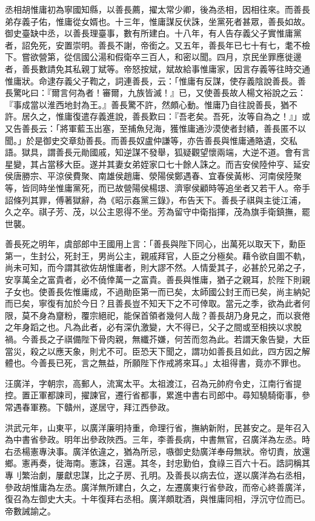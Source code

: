 丞相胡惟庸初為寧國知縣，以善長薦，擢太常少卿，後為丞相，因相往來。而善長弟存義子佑，惟庸從女婿也。十三年，惟庸謀反伏誅，坐黨死者甚眾，善長如故。御史臺缺中丞，以善長理臺事，數有所建白。十八年，有人告存義父子實惟庸黨者，詔免死，安置崇明。善長不謝，帝銜之。又五年，善長年已七十有七，耄不檢下。嘗欲營第，從信國公湯和假衛卒三百人，和密以聞。四月，京民坐罪應徙邊者，善長數請免其私親丁斌等。帝怒按斌，斌故給事惟庸家，因言存義等往時交通惟庸狀。命逮存義父子鞫之，詞連善長，云：「惟庸有反謀，使存義陰說善長。善長驚叱曰：『爾言何為者！審爾，九族皆滅！』已，又使善長故人楊文裕說之云：『事成當以淮西地封為王。』善長驚不許，然頗心動。惟庸乃自往說善長，猶不許。居久之，惟庸復遣存義進說，善長歎曰：『吾老矣。吾死，汝等自為之！』」或又告善長云：「將軍藍玉出塞，至捕魚兒海，獲惟庸通沙漠使者封績，善長匿不以聞。」於是御史交章劾善長。而善長奴盧仲謙等，亦告善長與惟庸通賂遺，交私語。獄具，謂善長元勛國戚，知逆謀不發舉，狐疑觀望懷兩端，大逆不道。會有言星變，其占當移大臣。遂并其妻女弟姪家口七十餘人誅之。而吉安侯陸仲亨、延安侯唐勝宗、平涼侯費聚、南雄侯趙庸、滎陽侯鄭遇春、宜春侯黃彬、河南侯陸聚等，皆同時坐惟庸黨死，而已故營陽侯楊璟、濟寧侯顧時等追坐者又若干人。帝手詔條列其罪，傅著獄辭，為《昭示姦黨三錄》，布告天下。善長子祺與主徙江浦，久之卒。祺子芳、茂，以公主恩得不坐。芳為留守中衛指揮，茂為旗手衛鎮撫，罷世襲。

善長死之明年，虞部郎中王國用上言：「善長與陛下同心，出萬死以取天下，勳臣第一，生封公，死封王，男尚公主，親戚拜官，人臣之分極矣。藉令欲自圖不軌，尚未可知，而今謂其欲佐胡惟庸者，則大謬不然。人情愛其子，必甚於兄弟之子，安享萬全之富貴者，必不僥倖萬一之富貴。善長與惟庸，猶子之親耳，於陛下則親子女也。使善長佐惟庸成，不過勛臣第一而已矣，太師國公封王而已矣，尚主納妃而已矣，寧復有加於今日？且善長豈不知天下之不可倖取。當元之季，欲為此者何限，莫不身為齏粉，覆宗絕祀，能保首領者幾何人哉？善長胡乃身見之，而以衰倦之年身蹈之也。凡為此者，必有深仇激變，大不得已，父子之間或至相挾以求脫禍。今善長之子祺備陛下骨肉親，無纖芥嫌，何苦而忽為此。若謂天象告變，大臣當災，殺之以應天象，則尤不可。臣恐天下聞之，謂功如善長且如此，四方因之解體也。今善長已死，言之無益，所願陛下作戒將來耳。」太祖得書，竟亦不罪也。

汪廣洋，字朝宗，高郵人，流寓太平。太祖渡江，召為元帥府令史，江南行省提控。置正軍都諫司，擢諫官，遷行省都事，累進中書右司郎中。尋知驍騎衛事，參常遇春軍務。下贛州，遂居守，拜江西參政。

洪武元年，山東平，以廣洋廉明持重，命理行省，撫納新附，民甚安之。是年召入為中書省參政。明年出參政陜西。三年，李善長病，中書無官，召廣洋為左丞。時右丞楊憲專決事。廣洋依違之，猶為所忌，嗾御史劾廣洋奉母無狀。帝切責，放還鄉。憲再奏，徙海南。憲誅，召還。其冬，封忠勤伯，食祿三百六十石。誥詞稱其專刂繁治劇，屢獻忠謀，比之子房、孔明。及善長以病去位，遂以廣洋為右丞相，參政胡惟庸為左丞。廣洋無所建白，久之，左遷廣東行省參政，而帝心終善廣洋，復召為左御史大夫。十年復拜右丞相。廣洋頗耽酒，與惟庸同相，浮沉守位而已。帝數誡諭之。

